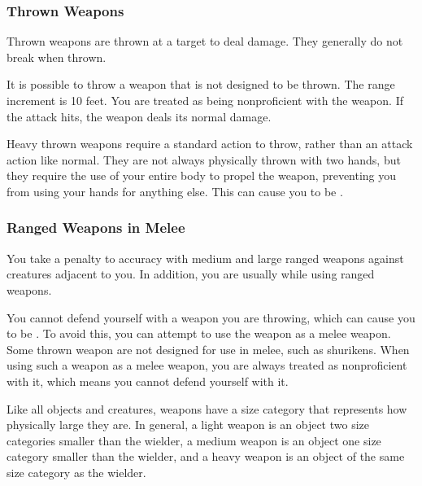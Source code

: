             \subsubsection{Thrown Weapons}\label{Thrown Weapons} Thrown weapons are thrown at a target to deal damage. They generally do not break when thrown.

                 It is possible to throw a weapon that is not designed to be thrown. The range increment is 10 feet. You are treated as being nonproficient with the weapon. If the attack hits, the weapon deals its normal damage.

                 Heavy thrown weapons require a standard action to throw, rather than an attack action like normal.
                They are not always physically thrown with two hands, but they require the use of your entire body to propel the weapon, preventing you from using your hands for anything else.
                This can cause you to be .

            \subsubsection{Ranged Weapons in Melee}

                You take a  penalty to accuracy with medium and large ranged weapons against creatures adjacent to you. In addition, you are usually  while using ranged weapons.

                \label{Thrown Weapons in Melee} You cannot defend yourself with a weapon you are throwing, which can cause you to be . To avoid this, you can attempt to use the weapon as a melee weapon. Some thrown weapon are not designed for use in melee, such as shurikens. When using such a weapon as a melee weapon, you are always treated as nonproficient with it, which means you cannot defend yourself with it.

                 Like all objects and creatures, weapons have a size category that represents how physically large they are. In general, a light weapon is an object two size categories smaller than the wielder, a medium weapon is an object one size category smaller than the wielder, and a heavy weapon is an object of the same size category as the wielder.

